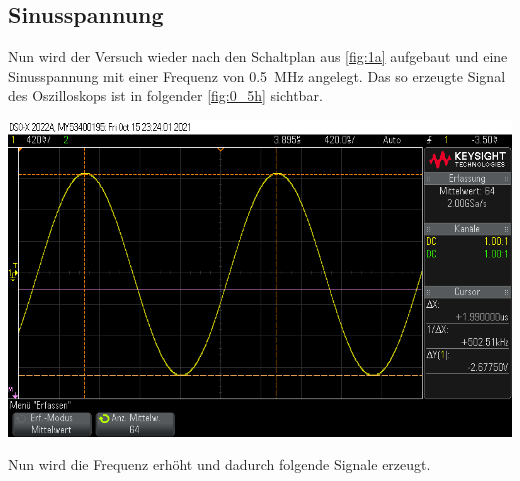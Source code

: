\documentclass[11pt,ngerman]{scrartcl}
\begin{document}
\subsection{Sinusspannung}

\noindent Nun wird der Versuch wieder nach den Schaltplan aus \autoref{fig:1a} aufgebaut und eine Sinusspannung mit einer Frequenz von \SI{0.5}{MHz} angelegt.
\noindent Das so erzeugte Signal des Oszilloskops ist in folgender \autoref{fig:0_5h} sichtbar.

\begin{center}
	\begin{minipage}[t]{0.7\textwidth}
		\includegraphics[width=\textwidth]{oszi/scope_0_36}
		\label{fig:0_5h}
	\end{minipage}
\end{center}

\noindent Nun wird die Frequenz erhöht und dadurch folgende Signale erzeugt.

\vspace{2mm}
\end{document}
